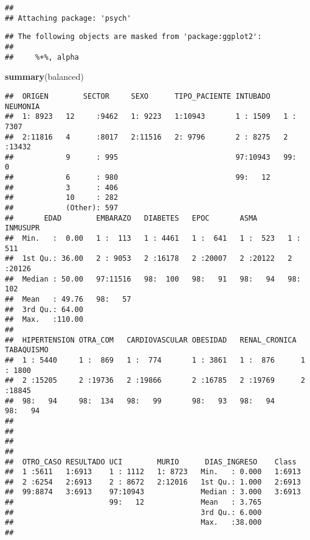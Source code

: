 \documentclass[]{article}
\newenvironment{Shaded}{\begin{snugshade}}{\end{snugshade}}
\newcommand{\KeywordTok}[1]{\textcolor[rgb]{0.13,0.29,0.53}{\textbf{#1}}}
\newcommand{\NormalTok}[1]{#1}
\begin{document}
\begin{verbatim}
## 
## Attaching package: 'psych'
\end{verbatim}

\begin{verbatim}
## The following objects are masked from 'package:ggplot2':
## 
##     %+%, alpha
\end{verbatim}

\begin{Shaded}
\begin{Highlighting}[]
\KeywordTok{summary}\NormalTok{(balanced)}
\end{Highlighting}
\end{Shaded}

\begin{verbatim}
##  ORIGEN        SECTOR     SEXO      TIPO_PACIENTE INTUBADO   NEUMONIA  
##  1: 8923   12     :9462   1: 9223   1:10943       1 : 1509   1 : 7307  
##  2:11816   4      :8017   2:11516   2: 9796       2 : 8275   2 :13432  
##            9      : 995                           97:10943   99:    0  
##            6      : 980                           99:   12             
##            3      : 406                                                
##            10     : 282                                                
##            (Other): 597                                                
##       EDAD        EMBARAZO   DIABETES   EPOC       ASMA       INMUSUPR  
##  Min.   :  0.00   1 :  113   1 : 4461   1 :  641   1 :  523   1 :  511  
##  1st Qu.: 36.00   2 : 9053   2 :16178   2 :20007   2 :20122   2 :20126  
##  Median : 50.00   97:11516   98:  100   98:   91   98:   94   98:  102  
##  Mean   : 49.76   98:   57                                              
##  3rd Qu.: 64.00                                                         
##  Max.   :110.00                                                         
##                                                                         
##  HIPERTENSION OTRA_COM   CARDIOVASCULAR OBESIDAD   RENAL_CRONICA TABAQUISMO
##  1 : 5440     1 :  869   1 :  774       1 : 3861   1 :  876      1 : 1800  
##  2 :15205     2 :19736   2 :19866       2 :16785   2 :19769      2 :18845  
##  98:   94     98:  134   98:   99       98:   93   98:   94      98:   94  
##                                                                            
##                                                                            
##                                                                            
##                                                                            
##  OTRO_CASO RESULTADO UCI        MURIO      DIAS_INGRESO    Class   
##  1 :5611   1:6913    1 : 1112   1: 8723   Min.   : 0.000   1:6913  
##  2 :6254   2:6913    2 : 8672   2:12016   1st Qu.: 1.000   2:6913  
##  99:8874   3:6913    97:10943             Median : 3.000   3:6913  
##                      99:   12             Mean   : 3.765           
##                                           3rd Qu.: 6.000           
##                                           Max.   :38.000           
## 
\end{verbatim}
\end{document}
